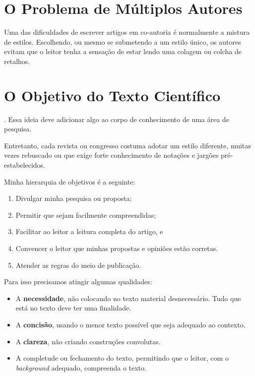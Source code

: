 \documentclass{article}
\begin{document}
\section{O Problema de Múltiplos Autores}

 Uma das dificuldades de escrever artigos em co-autoria é normalmente a mistura de estilos. Escolhendo, ou mesmo se submetendo a um estilo único, os autores evitam que o leitor tenha a sensação de estar lendo uma colagem ou colcha de retalhos.

\section{O Objetivo do Texto Científico}

. Essa ideia deve adicionar algo ao corpo de conhecimento de uma área de pesquisa. 

 Entretanto, cada revista ou congresso costuma adotar um estilo diferente, muitas vezes  rebuscado ou que exige forte conhecimento de notações e jargões pré-estabelecidos. 

Minha hierarquia de objetivos é a seguinte:
\begin{enumerate}
    \item Divulgar minha pesquisa ou proposta;
    \item Permitir que sejam facilmente compreendidas;
    \item Facilitar ao leitor a leitura completa do artigo, e
    \item Convencer o leitor que minhas propostas e opiniões estão corretas.
    \item Atender as regras do meio de publicação.
\end{enumerate}

Para isso precisamos atingir algumas qualidades:
\begin{itemize}
    \item A \textbf{necessidade}, não colocando no texto material desnecessário. Tudo que está no texto deve ter uma finalidade.
    \item A \textbf{concisão}, usando o menor texto possível que seja adequado ao contexto.
    \item A \textbf{clareza}, não criando construções convolutas.
    \item A completude ou fechamento do texto, permitindo que o leitor, com o \textit{background} adequado, compreenda o texto.
\end{itemize}
\end{document}
